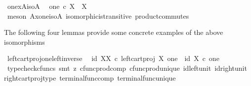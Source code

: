 \begin{isabellebody}
\endisatagproof
{\isafoldproof}%
%
\isadelimproof
\isanewline
%
\endisadelimproof
\isanewline
{}\isamarkupfalse%
\ one{\isacharunderscore}{\kern0pt}x{\isacharunderscore}{\kern0pt}A{\isacharunderscore}{\kern0pt}iso{\isacharunderscore}{\kern0pt}A{\isacharcolon}{\kern0pt}\isanewline
\ \ {\isachardoublequoteopen}one\ {\isasymtimes}\isactrlsub c\ X\ {\isasymcong}\ X{\isachardoublequoteclose}\isanewline
%
\isadelimproof
\ \ %
\endisadelimproof
%
\isatagproof
{}\isamarkupfalse%
\ {\isacharparenleft}{\kern0pt}meson\ A{\isacharunderscore}{\kern0pt}x{\isacharunderscore}{\kern0pt}one{\isacharunderscore}{\kern0pt}iso{\isacharunderscore}{\kern0pt}A\ isomorphic{\isacharunderscore}{\kern0pt}is{\isacharunderscore}{\kern0pt}transitive\ product{\isacharunderscore}{\kern0pt}commutes{\isacharparenright}{\kern0pt}%
\endisatagproof
{\isafoldproof}%
%
\isadelimproof
%
\endisadelimproof
%
\begin{isamarkuptext}%
The following four lemmas provide some concrete examples of the above isomorphisms%
\end{isamarkuptext}\isamarkuptrue%
\isamarkupfalse%
\ left{\isacharunderscore}{\kern0pt}cart{\isacharunderscore}{\kern0pt}proj{\isacharunderscore}{\kern0pt}one{\isacharunderscore}{\kern0pt}left{\isacharunderscore}{\kern0pt}inverse{\isacharcolon}{\kern0pt}\isanewline
\ \ {\isachardoublequoteopen}{\isasymlangle}id\ X{\isacharcomma}{\kern0pt}{\isasymbeta}\isactrlbsub X\isactrlesub {\isasymrangle}\ {\isasymcirc}\isactrlsub c\ left{\isacharunderscore}{\kern0pt}cart{\isacharunderscore}{\kern0pt}proj\ X\ one\ {\isacharequal}{\kern0pt}\ id\ {\isacharparenleft}{\kern0pt}X\ {\isasymtimes}\isactrlsub c\ one{\isacharparenright}{\kern0pt}{\isachardoublequoteclose}\isanewline
%
\isadelimproof
\ \ %
\endisadelimproof
%
\isatagproof
{}\isamarkupfalse%
\ {\isacharparenleft}{\kern0pt}typecheck{\isacharunderscore}{\kern0pt}cfuncs{\isacharcomma}{\kern0pt}\ smt\ {\isacharparenleft}{\kern0pt}z{}{\isacharparenright}{\kern0pt}\ cfunc{\isacharunderscore}{\kern0pt}prod{\isacharunderscore}{\kern0pt}comp\ cfunc{\isacharunderscore}{\kern0pt}prod{\isacharunderscore}{\kern0pt}unique\ id{\isacharunderscore}{\kern0pt}left{\isacharunderscore}{\kern0pt}unit{}\ id{\isacharunderscore}{\kern0pt}right{\isacharunderscore}{\kern0pt}unit{}\ right{\isacharunderscore}{\kern0pt}cart{\isacharunderscore}{\kern0pt}proj{\isacharunderscore}{\kern0pt}type\ terminal{\isacharunderscore}{\kern0pt}func{\isacharunderscore}{\kern0pt}comp\ terminal{\isacharunderscore}{\kern0pt}func{\isacharunderscore}{\kern0pt}unique{\isacharparenright}{\kern0pt}%

\end{isabellebody}
